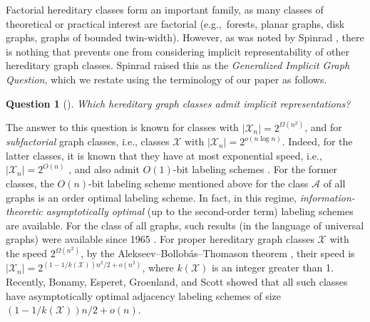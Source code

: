 \documentclass[letterpaper,11pt]{article}
\newcommand{\Ac}{\mathcal{A}}
\newcommand{\Xc}{\mathcal{X}}
\newtheorem{question}{Question}
\theoremstyle{definition}
\theoremstyle{remark}
\begin{document}
	
	Factorial hereditary classes form an important family, as many classes of theoretical or practical interest are factorial (e.g.,~forests, planar graphs, disk graphs, graphs of bounded twin-width). However, as was noted by Spinrad \cite{Spinrad03}, there is nothing that prevents one from considering implicit representability of other hereditary graph classes. Spinrad \cite{Spinrad03} raised this as the \textit{Generalized Implicit Graph Question}, which we restate using the terminology of our paper as follows.
	
	\begin{question}[\cite{Spinrad03}]\label{q:gen-igq}
		Which hereditary graph classes admit implicit representations?
	\end{question}

	The answer to this question is known for classes with $|\Xc_n| = 2^{\Omega(n^2)}$, and for \emph{subfactorial} graph classes, i.e., classes $\Xc$ with $|\Xc_n| = 2^{o(n\log n)}$. Indeed, for the latter classes, it is known that they have at most exponential speed, i.e., $|\Xc_n| = 2^{O(n)}$ \cite{Alekseev97,SZ94}, and also admit $O(1)$-bit labeling schemes \cite{Sch99}.
	For the former classes, the $O(n)$-bit labeling scheme mentioned above for the
	class $\Ac$ of all graphs is an order optimal labeling scheme.
	In fact, in this regime, \emph{information-theoretic asymptotically optimal} (up to the second-order term) labeling schemes are available. For the class of all graphs, such results (in the language of universal graphs) were available since 1965 \cite{moon65,AKTZ15,A17}. 
	For proper hereditary graph classes $\Xc$ with the speed $2^{\Omega(n^2)}$,
	by the Alekseev–Bollobás–Thomason theorem \cite{Ale92,BT95}, their speed is $|\Xc_n| = 2^{(1-1/k(\Xc))n^2/2 + o(n^2)}$, where $k(\Xc)$ is an integer greater than 1. Recently, Bonamy, Esperet, Groenland, and Scott showed \cite{BEGS21} that all such classes have asymptotically optimal adjacency labeling schemes of size $(1-1/k(\Xc))n/2 + o(n)$.
	
\end{document}

